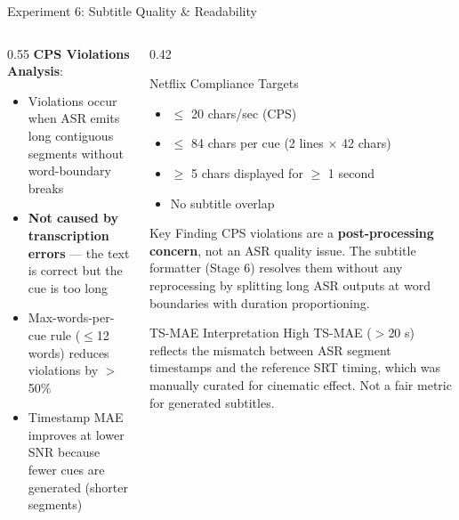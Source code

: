 \documentclass[aspectratio=169]{beamer}
\begin{document}
\begin{frame}{Experiment 6: Subtitle Quality \& Readability}
\begin{columns}[T]
\begin{column}{0.55\textwidth}
      \vspace{0.2cm}
      \textbf{CPS Violations Analysis}:
      \begin{itemize}
        \item Violations occur when ASR emits long contiguous segments without word-boundary breaks
        \item \textbf{Not caused by transcription errors} — the text is correct but the cue is too long
        \item Max-words-per-cue rule ($\leq$12 words) reduces violations by $>$50\%
        \item Timestamp MAE improves at lower SNR because fewer cues are generated (shorter segments)
      \end{itemize}
    \end{column}
    \begin{column}{0.42\textwidth}
      \begin{block}{Netflix Compliance Targets}
        \begin{itemize}
          \item $\leq$ 20 chars/sec (CPS)
          \item $\leq$ 84 chars per cue (2 lines $\times$ 42 chars)
          \item $\geq$ 5 chars displayed for $\geq$ 1 second
          \item No subtitle overlap
        \end{itemize}
      \end{block}
      \begin{block}{Key Finding}
        CPS violations are a \textbf{post-processing concern}, not an ASR quality issue. The subtitle formatter (Stage 6) resolves them without any reprocessing by splitting long ASR outputs at word boundaries with duration proportioning.
      \end{block}
      \begin{alertblock}{TS-MAE Interpretation}
        High TS-MAE ($>$20 s) reflects the mismatch between ASR segment timestamps and the reference SRT timing, which was manually curated for cinematic effect. Not a fair metric for generated subtitles.
      \end{alertblock}
    \end{column}
  \end{columns}
\end{frame}

\end{document}
